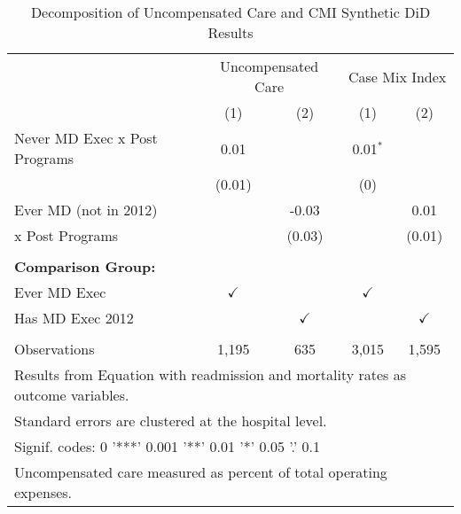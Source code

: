 \begin{table}[ht!]

\caption{\label{tab:MD_noMD_uncompCMI_decomp_synth}Decomposition of Uncompensated Care and CMI Synthetic DiD Results}
\centering
\begin{tabular}[t]{lcccc}
\toprule
\multicolumn{1}{c}{ } & \multicolumn{2}{c}{Uncompensated Care} & \multicolumn{2}{c}{Case Mix Index} \\
 & (1) & (2) & (1) & (2)\\
\midrule
Never MD Exec x Post Programs & 0.01 &  & 0.01$^{*}$ & \\
 & (0.01) &  & (0) & \\
Ever MD (not in 2012) &  & -0.03 &  & 0.01\\
 \hspace{3mm} x Post Programs&  & (0.03) &  & (0.01)\\
 &  &  &  & \\
\addlinespace
\textbf{Comparison Group:} &  &  &  & \\
Ever MD Exec & $\checkmark$ &  & $\checkmark$ & \\
Has MD Exec 2012 &  & $\checkmark$ &  & $\checkmark$\\
 &  &  &  & \\
Observations & 1,195 & 635 & 3,015 & 1,595\\
\bottomrule
\multicolumn{5}{l}{\textsuperscript{} Results from Equation with readmission and mortality rates as outcome variables.}\\
\multicolumn{5}{l}{\textsuperscript{} Standard errors are clustered at the hospital level.}\\
\multicolumn{5}{l}{\textsuperscript{} Signif. codes: 0 '***' 0.001 '**' 0.01 '*' 0.05 '.' 0.1}\\
\multicolumn{5}{l}{\textsuperscript{} Uncompensated care measured as percent of total operating expenses.}\\
\end{tabular}
\end{table}
